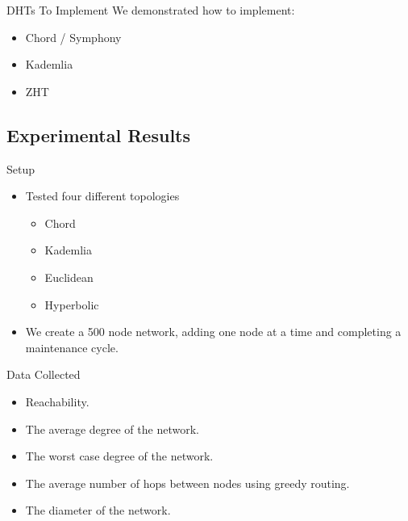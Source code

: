 \documentclass[11pt]{beamer}
\begin{document}
\begin{frame}{DHTs To Implement}
	We demonstrated how to implement:
	\begin{itemize}
		\item Chord / Symphony
		\item Kademlia 
		\item ZHT
	\end{itemize}
\end{frame}


\subsection{Experimental Results}


\begin{frame}{Setup}
	\begin{itemize}
		\item Tested four different topologies
		\begin{itemize}
			\item Chord
			\item Kademlia
			\item Euclidean
			\item Hyperbolic
		\end{itemize}
		\item We create a 500 node network, adding one node at a time and completing a maintenance cycle.
	\end{itemize}
\end{frame}


\begin{frame}{Data Collected}
	\begin{itemize}
		\item Reachability.
		\item The average degree of the network. 
		\item The worst case degree of the network.
		\item The average number of hops between nodes using greedy routing.
		\item The diameter of the network.  
		
	\end{itemize}
\end{frame}
\end{document}
